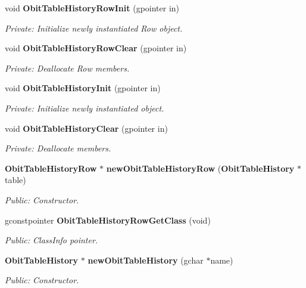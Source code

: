 \begin{CompactItemize}
\item 
void {\bf Obit\-Table\-History\-Row\-Init} (gpointer in)
\begin{CompactList}\small\item\em Private: Initialize newly instantiated Row object. \item\end{CompactList}\item 
void {\bf Obit\-Table\-History\-Row\-Clear} (gpointer in)
\begin{CompactList}\small\item\em Private: Deallocate Row members. \item\end{CompactList}\item 
void {\bf Obit\-Table\-History\-Init} (gpointer in)
\begin{CompactList}\small\item\em Private: Initialize newly instantiated object. \item\end{CompactList}\item 
void {\bf Obit\-Table\-History\-Clear} (gpointer in)
\begin{CompactList}\small\item\em Private: Deallocate members. \item\end{CompactList}\item 
{\bf Obit\-Table\-History\-Row} $\ast$ {\bf new\-Obit\-Table\-History\-Row} ({\bf Obit\-Table\-History} $\ast$table)
\begin{CompactList}\small\item\em Public: Constructor. \item\end{CompactList}\item 
gconstpointer {\bf Obit\-Table\-History\-Row\-Get\-Class} (void)
\begin{CompactList}\small\item\em Public: Class\-Info pointer. \item\end{CompactList}\item 
{\bf Obit\-Table\-History} $\ast$ {\bf new\-Obit\-Table\-History} (gchar $\ast$name)
\begin{CompactList}\small\item\em Public: Constructor. \item\end{CompactList}\item 

\end{CompactItemize}
